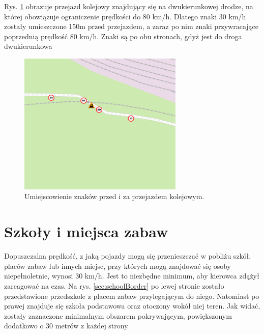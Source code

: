 Rys. \ref{sec:PrzejazdyKolejowe1} obrazuje przejazd kolejowy znajdujący się na dwukierunkowej drodze, na której obowiązuje ograniczenie prędkości do 80 km/h. Dlatego znaki 30 km/h zostały umieszczone 150m przed przejazdem, a zaraz po nim znaki przywracające poprzednią prędkość 80 km/h. Znaki są po obu stronach, gdyż jest do droga dwukierunkowa

\begin{figure}[h]
\caption{Umiejscowienie znaków przed i za przejazdem kolejowym.}
\label{sec:PrzejazdyKolejowe1}
\centering
\includegraphics[width=0.7\textwidth]{streetBeforeRail}
\end{figure}


\newpage
\section{Szkoły i miejsca zabaw}
\label{sec:schoolsMain}

Dopuszczalna prędkość, z jaką pojazdy mogą się przenieszczać w pobliżu szkół, placów zabaw lub innych miejsc, przy których mogą znajdować się osoby niepełnoletnie, wynosi 30 km/h. Jest to niezbędne minimum, aby kierowca zdążył zareagować na czas. Na rys. \ref{sec:schoolBorder} po lewej stronie zostało przedstawione przedszkole z placem zabaw przylegającym do niego. Natomiast po prawej znajduje się szkoła podstawowa oraz otoczony wokół niej teren. Jak widać, zostały zaznaczone minimalnym obszarem pokrywającym, powiększonym dodatkowo o 30 metrów z każdej strony

